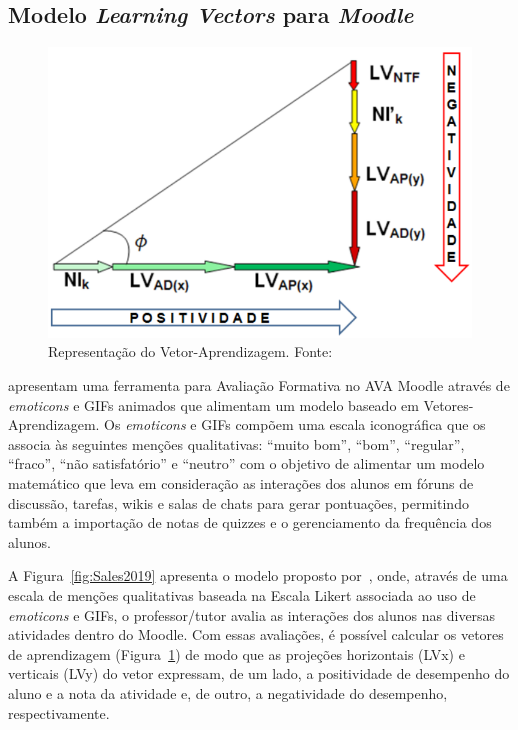 \subsection{Modelo \textit{Learning Vectors} para \textit{Moodle}}
\label{sec:learningvectors}

\begin{figure}[htb]
	\centering
	\includegraphics[width=0.45\linewidth]{chapters/works/Sales2019_LearningVectors_FatorB2.png}
	\caption{Representação do Vetor-Aprendizagem. Fonte:\cite{sales:2019}}
	\label{fig:Sales2019fatorbeta}
\end{figure}

\cite{sales:2019} apresentam uma ferramenta para Avaliação Formativa no AVA Moodle através de \textit{emoticons} e GIFs animados que alimentam um modelo baseado em Vetores-Aprendizagem. Os \textit{emoticons} e GIFs compõem uma escala iconográfica que os associa às seguintes menções qualitativas: ``muito bom'', ``bom'', ``regular'', ``fraco'', ``não satisfatório'' e ``neutro'' com o objetivo de alimentar um modelo matemático que leva em consideração as interações dos alunos em fóruns de discussão, tarefas, wikis e salas de chats para gerar pontuações, permitindo também a importação de notas de quizzes e o gerenciamento da frequência dos alunos.

A Figura~\ref{fig:Sales2019} apresenta o modelo proposto por~\cite{sales:2019}, onde, através de uma escala de menções qualitativas baseada na Escala Likert associada ao uso de \textit{emoticons} e GIFs, o professor/tutor avalia as interações dos alunos nas diversas atividades dentro do Moodle. Com essas avaliações, é possível calcular os vetores de aprendizagem (Figura~\ref{fig:Sales2019fatorbeta}) de modo que as projeções horizontais (LVx) e verticais (LV{y}) do vetor expressam, de um lado, a positividade de desempenho do aluno e a nota da atividade e, de outro, a negatividade do desempenho, respectivamente.

